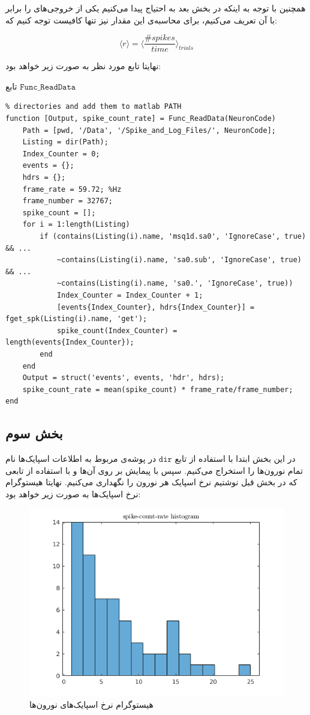 \documentclass[12pt,onecolumn,a4paper,fleqn]{article}
\newcommand{\pf}[1]{$\mathtt{#1}$}
\begin{document}
		همچنین با توجه به اینکه در بخش بعد به  احتیاج پیدا می‌کنیم یکی از خروجی‌های  را برابر با آن تعریف می‌کنیم، برای محاسبه‌ی این مقدار نیز تنها کافیست توجه کنیم که:
		
		$$ \langle r \rangle = \langle \frac{\#spikes}{time} \rangle_{trials}$$
		
		 نهایتا تابع مورد نظر به صورت زیر خواهد بود:
		


\begin{code}{تابع \pf{Func\_ReadData}}
	\begin{latin}
		\begin{lstlisting}[style=Matlab-editor, tabsize=2]
% Recomend: select Data/ and MatlabFucntions/
% directories and add them to matlab PATH
function [Output, spike_count_rate] = Func_ReadData(NeuronCode)
	Path = [pwd, '/Data', '/Spike_and_Log_Files/', NeuronCode];
	Listing = dir(Path);
	Index_Counter = 0;
	events = {};
	hdrs = {};
	frame_rate = 59.72; %Hz
	frame_number = 32767;
	spike_count = [];
	for i = 1:length(Listing)
		if (contains(Listing(i).name, 'msq1d.sa0', 'IgnoreCase', true) && ...
			~contains(Listing(i).name, 'sa0.sub', 'IgnoreCase', true) && ...
			~contains(Listing(i).name, 'sa0.', 'IgnoreCase', true))
			Index_Counter = Index_Counter + 1;
			[events{Index_Counter}, hdrs{Index_Counter}] = fget_spk(Listing(i).name, 'get');
			spike_count(Index_Counter) = length(events{Index_Counter});
		end
	end
	Output = struct('events', events, 'hdr', hdrs);
	spike_count_rate = mean(spike_count) * frame_rate/frame_number;
end
		\end{lstlisting}
	\end{latin}
\end{code}

\subsection{بخش سوم}
در این بخش ابتدا با استفاده از تابع \pf{dir} در پوشه‌ی مربوط به اطلاعات اسپایک‌ها نام تمام نورون‌ها را استخراج می‌کنیم. سپس با پیمایش بر روی‌ آن‌ها و با استفاده از تابعی که در بخش قبل نوشتیم نرخ اسپایک هر نورون را نگهداری می‌کنیم. نهایتا هیستوگرام نرخ‌ اسپایک‌ها به صورت زیر خواهد بود:

\begin{figure}[h]
	\centering
	\includegraphics[width=0.6\linewidth]{photos/fr-histogram.png}
	\caption{هیستوگرام نرخ اسپایک‌های نورون‌ها}
	\label{2}
\end{figure}
\end{document}
